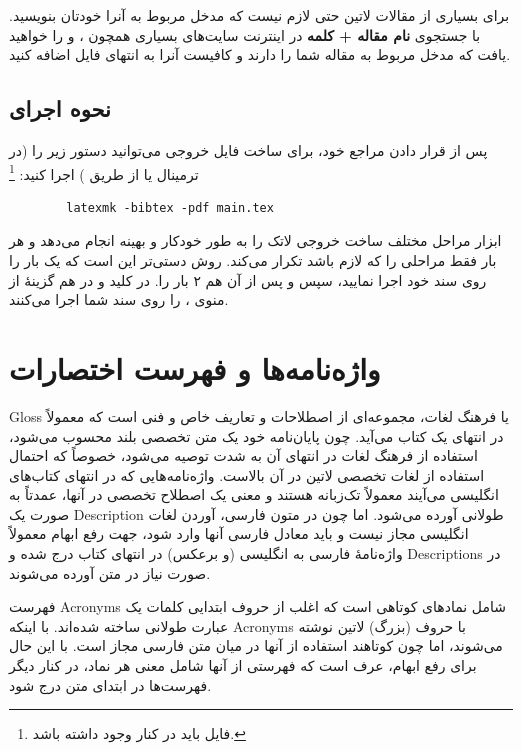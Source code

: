 برای بسیاری از مقالات لاتین حتی لازم نیست که مدخل مربوط به آنرا خودتان بنویسید. با جستجوی 
\textbf{نام مقاله + کلمه
}
در اینترنت سایت‌های بسیاری همچون
،  و 
را خواهید یافت که مدخل
مربوط به مقاله شما را دارند و کافیست آنرا به انتهای فایل
اضافه کنید.

\subsection{نحوه اجرای \texorpdfstring{}{Bib\TeX}}
پس از قرار دادن مراجع خود، برای ساخت فایل خروجی می‌توانید دستور زیر را (در ترمینال یا از طریق ) اجرا کنید:%
\footnote{فایل  باید در کنار  وجود داشته باشد.}

\singlespacing
\begin{LTR}
	\begin{verbatim}
		latexmk -bibtex -pdf main.tex
	\end{verbatim}
\end{LTR}
\doublespacing
ابزار  مراحل مختلف ساخت خروجی لاتک را به طور خودکار و بهینه انجام می‌دهد و هر بار فقط مراحلی را که لازم باشد تکرار می‌کند.
روش دستی‌تر این است که یک بار  را روی سند خود اجرا نمایید، سپس  و پس از آن هم ۲ بار  را. در  کلید  و در  هم گزینهٔ  از منوی ،  را روی سند شما اجرا می‌کنند.

\section{واژه‌نامه‌ها و فهرست اختصارات}
\gls{Gloss}
یا فرهنگ لغات، مجموعه‌ای از اصطلاحات و تعاریف خاص و فنی است که معمولاً در انتهای یک کتاب می‌آید. چون پایان‌نامه خود یک متن تخصصی بلند محسوب می‌شود، استفاده از فرهنگ لغات در انتهای آن به شدت توصیه می‌شود، خصوصاً که احتمال استفاده از لغات تخصصی لاتین در آن بالاست.
واژه‌نامه‌هایی که در انتهای کتاب‌های انگلیسی می‌آیند معمولاً تک‌زبانه هستند و معنی یک اصطلاح تخصصی در آنها، عمدتاً به صورت یک
\gls{Description}
طولانی آورده می‌شود. اما چون در متون فارسی، آوردن لغات انگلیسی مجاز نیست و باید معادل فارسی آنها وارد شود، جهت رفع ابهام معمولاً واژه‌نامهٔ فارسی به انگلیسی (و برعکس) در انتهای کتاب درج شده و  
\glspl{Description}
در صورت نیاز در متن آورده می‌شوند.

فهرست
\glspl{Acronym}
شامل نمادهای کوتاهی است که اغلب از حروف ابتدایی کلمات یک عبارت طولانی ساخته شده‌اند. با اینکه
\glspl{Acronym}
با حروف (بزرگ) لاتین نوشته می‌شوند، اما چون کوتاهند استفاده از آنها در میان متن فارسی مجاز است. با این حال برای رفع ابهام، عرف است که فهرستی از آنها شامل معنی هر نماد، در کنار دیگر فهرست‌ها در ابتدای متن درج شود.

